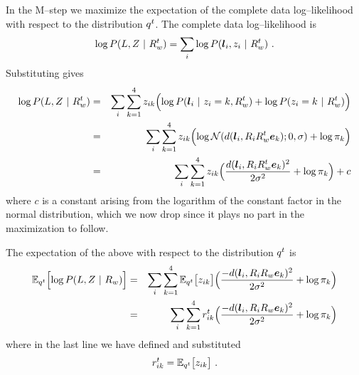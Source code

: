 In the M--step we maximize the expectation of the complete data
log--likelihood with respect to the distribution
$\PosteriorEst^t$. The complete data log--likelihood is
\begin{equation}
  \label{eq:complete-loglikelihood}
  \log P(\LineSegs,\Indicators ~|~ \SceneR^t) =
  \sum_i \log P(\LineSeg_i,\Indicator_i ~|~ \SceneR^t) ~.
\end{equation}
Substituting  gives
\begin{eqnarray}
  \log P(\LineSegs,\Indicators ~|~ \SceneR^t) 
  &=&
  \sum_i \sum_{k=1}^4 \Indicator_{ik} \Bigl(
    \log P(\LineSeg_i ~|~ \Indicator_i=k, \SceneR^t)
    + \log P(\Indicator_i=k ~|~ \SceneR^t)
  \Bigr)\\
  &=&
  \sum_i \sum_{k=1}^4 \Indicator_{ik} 
  \Bigl(
    \log \NormalDistr(\dist(\LineSeg_i, \CamR_i\SceneR^t\ebasis_k);0,\sigma)
    + \log \Mixing_k
  \Bigr)\\
  &=&
  \sum_i \sum_{k=1}^4 \Indicator_{ik} 
  \Bigl(
    \frac{\dist(\LineSeg_i, \CamR_i\SceneR^t\ebasis_k)^2}{2\sigma^2}
    + \log \Mixing_k
  \Bigr) + c\\
\end{eqnarray}
where $c$ is a constant arising from the logarithm of the constant
factor in the normal distribution, which we now drop since it plays no
part in the maximization to follow.

The expectation of the above with respect to the distribution
$\PosteriorEst^t$ is
\begin{eqnarray}
  \Expected_{\PosteriorEst^t}\Bigl[
    \log P(\LineSegs,\Indicators ~|~ \SceneR) 
  \Bigr]
  &=&
  \sum_i \sum_{k=1}^4
  \Expected_{\PosteriorEst^t} \bigl[ \Indicator_{ik} \bigr]
  \Bigl(
    \frac{-\dist(\LineSeg_i, \CamR_i\SceneR\ebasis_k)^2}{2\sigma^2}
    + \log \Mixing_k
  \Bigr)\\
  &=&
  \label{eq:expected-lik}
  \sum_i \sum_{k=1}^4
  \Resp_{ik}^t
  \Bigl(
    \frac{-\dist(\LineSeg_i, \CamR_i\SceneR\ebasis_k)^2}{2\sigma^2}
    + \log \Mixing_k
  \Bigr)
\end{eqnarray}
where in the last line we have defined and substituted
\begin{equation}
  \Resp_{ik}^t = 
  \Expected_{\PosteriorEst^t} \bigl[ \Indicator_{ik} \bigr] ~.
\end{equation}

